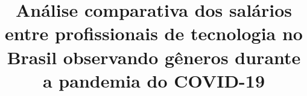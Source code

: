 \title{Análise comparativa dos salários entre profissionais de tecnologia no Brasil observando gêneros durante a pandemia do COVID-19 
}